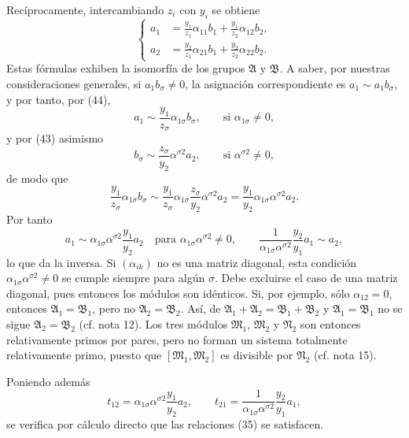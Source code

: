 Recíprocamente, intercambiando $z_i$ con $y_i$ se obtiene
\begin{equation}
\left\{
\begin{aligned}
 a_1&=\frac{y_1}{z_1}\alpha_{11}b_1+\frac{y_1}{z_2}\alpha_{12}b_2,\\
 a_2&=\frac{y_2}{z_1}\alpha_{21}b_1+\frac{y_2}{z_2}\alpha_{22}b_2.
\end{aligned}\right.
\tag{44}
\end{equation}
Estas fórmulas exhiben la isomorfía de los grupos $\mathfrak A$ y $\mathfrak B$. A saber, por nuestras consideraciones generales, si $a_1b_\sigma\ne0$, la asignación correspondiente es $a_1\sim a_1b_\sigma$, y por tanto, por (44),
\[
 a_1\sim\frac{y_1}{z_\sigma}\alpha_{1\sigma}b_\sigma,
 \qquad\text{si }\alpha_{1\sigma}\ne0,
\]
y por (43) asimismo
\[
 b_\sigma\sim\frac{z_\sigma}{y_2}\alpha^{\sigma2}a_2,
 \qquad\text{si }\alpha^{\sigma2}\ne0,
\]
de modo que
\[
 \frac{y_1}{z_\sigma}\alpha_{1\sigma}b_\sigma
 \sim
 \frac{y_1}{z_\sigma}\alpha_{1\sigma}\frac{z_\sigma}{y_2}\alpha^{\sigma2}a_2
 =\frac{y_1}{y_2}\alpha_{1\sigma}\alpha^{\sigma2}a_2.
\]
Por tanto
\[
 a_1\sim\alpha_{1\sigma}\alpha^{\sigma2}\frac{y_1}{y_2}a_2
 \quad\text{para }\alpha_{1\sigma}\alpha^{\sigma2}\ne0,
 \qquad
 \frac{1}{\alpha_{1\sigma}\alpha^{\sigma2}}\frac{y_2}{y_1}a_1\sim a_2,
\]
lo que da la inversa. Si $(\alpha_{ik})$ no es una matriz diagonal, esta condición $\alpha_{1\sigma}\alpha^{\sigma2}\ne0$ se cumple siempre para algún $\sigma$. Debe excluirse el caso de una matriz diagonal, pues entonces los módulos son idénticos. Si, por ejemplo, sólo $\alpha_{12}=0$, entonces $\mathfrak A_1=\mathfrak B_1$, pero no $\mathfrak A_2=\mathfrak B_2$. Así, de $\mathfrak A_1+\mathfrak A_2=\mathfrak B_1+\mathfrak B_2$ y $\mathfrak A_1=\mathfrak B_1$ no se sigue $\mathfrak A_2=\mathfrak B_2$ (cf. nota 12). Los tres módulos $\mathfrak M_1$, $\mathfrak M_2$ y $\mathfrak N_2$ son entonces relativamente primos por pares, pero no forman un sistema totalmente relativamente primo, puesto que $[\mathfrak M_1,\mathfrak M_2]$ es divisible por $\mathfrak N_2$ (cf. nota 15).

Poniendo además
\[
 t_{12}=\alpha_{1\sigma}\alpha^{\sigma2}\frac{y_1}{y_2}a_2,
 \qquad
 t_{21}=\frac{1}{\alpha_{1\sigma}\alpha^{\sigma2}}\frac{y_2}{y_1}a_1,
\]
se verifica por cálculo directo que las relaciones (35) se satisfacen.

